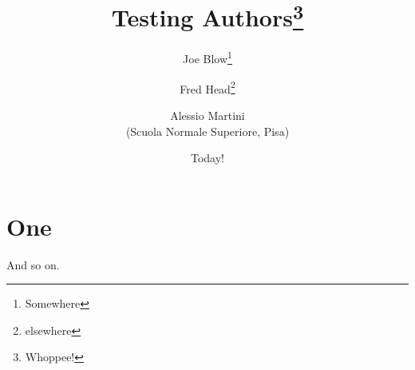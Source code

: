 \documentclass{article}
\title{Testing Authors\thanks{Whoppee!}}
\author{Joe Blow\thanks{Somewhere}\and Fred Head\thanks{elsewhere}\and
  Alessio Martini\\(Scuola Normale Superiore, Pisa)}
\date{Today!}
\begin{document}
\maketitle
\section{One}\label{sec:one}
And so on.
\end{document}
